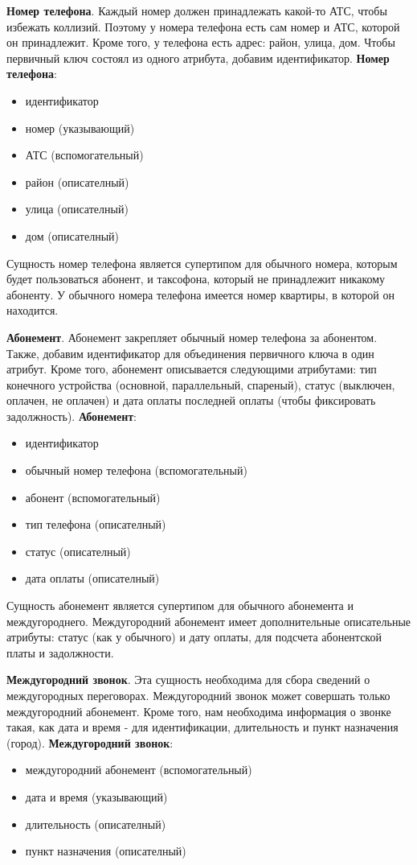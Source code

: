 \documentclass{report}
\begin{document}
\textbf{Номер телефона}. Каждый номер должен принадлежать какой-то АТС, 
чтобы избежать коллизий. Поэтому у номера телефона есть сам номер
и АТС, которой он принадлежит. Кроме того, у телефона есть адрес: 
район, улица, дом. Чтобы первичный ключ состоял из одного атрибута, 
добавим идентификатор. 
\newline\textbf{Номер телефона}:
\begin{itemize}
    \item идентификатор
    \item номер (указывающий)
    \item АТС (вспомогательный)
    \item район (описателный)
    \item улица (описателный)
    \item дом (описателный)
\end{itemize}
Сущность номер телефона является супертипом для обычного номера, 
которым будет пользоваться абонент, и таксофона, который не принадлежит
никакому абоненту. У обычного номера телефона имеется номер квартиры, 
в которой он находится. 

\textbf{Абонемент}. Абонемент закрепляет обычный номер телефона за абонентом.
Также, добавим идентификатор для объединения первичного ключа в один атрибут.
Кроме того, абонемент описывается следующими атрибутами: тип конечного 
устройства (основной, параллельный, спареный), статус 
(выключен, оплачен, не оплачен) и дата оплаты последней оплаты 
(чтобы фиксировать задолжность). 
\newline\textbf{Абонемент}:
\begin{itemize}
    \item идентификатор
    \item обычный номер телефона (вспомогательный)
    \item абонент (вспомогательный)
    \item тип телефона (описателный)
    \item статус (описателный)
    \item дата оплаты (описателный)
\end{itemize}
Сущность абонемент является супертипом для обычного абонемента и междугороднего.
Междугородний абонемент имеет дополнительные описательные атрибуты: 
статус (как у обычного) и дату оплаты, для подсчета абонентской 
платы и задолжности.

\textbf{Междугородний звонок}. Эта сущность необходима для сбора сведений 
о междугородных переговорах. Междугородний звонок может совершать только 
междугородний абонемент. Кроме того, нам необходима информация о звонке такая,
как дата и время - для идентификации, длительность и пункт назначения (город).
\newline\textbf{Междугородний звонок}:
\begin{itemize}
    \item междугородний абонемент (вспомогательный)
    \item дата и время (указывающий)
    \item длительность (описателный)
    \item пункт назначения (описателный)
\end{itemize}
\end{document}
